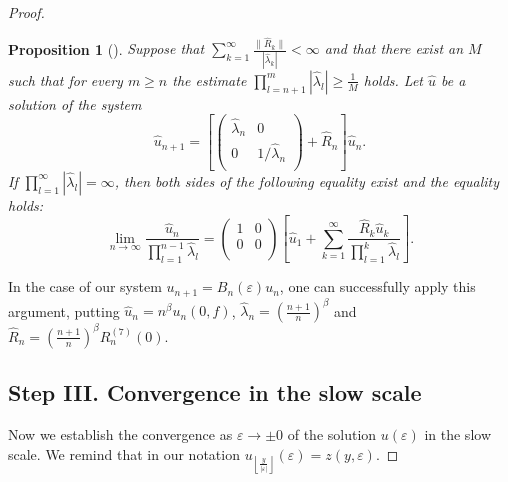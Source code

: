 \documentclass[a4paper,oneside,12pt]{amsart}
\newtheorem{prop}{Proposition}
\begin{document}
\begin{proof}
    \begin{prop}[\cite{Janas-Simonov-2010}]\label{proposition from Janas-Simonov}
    Suppose that $\sum\limits_{k=1}^{\infty}\frac{\|\hat R_k\|}{\left|\hat\lambda_k\right|}<\infty$ and that there exist an $M$ such that for every $m\ge n$ the estimate $\prod\limits_{l=n+1}^m|\hat\lambda_l|\ge\frac1M$ holds. Let $\hat u$ be a solution of the system
    \begin{equation*}
        \hat u_{n+1}=\left[
        \left(            \begin{array}{cc}
            \hat\lambda_n & 0 \\
            0 & 1/{\hat\lambda_n} \\
            \end{array}        \right)
        +\hat R_n\right]\hat u_n.
    \end{equation*}
    If $\prod\limits_{l=1}^{\infty}|\hat\lambda_l|=\infty$, then both sides of the following equality exist and the equality holds:
    \begin{equation*}
        \lim\limits_{n\rightarrow\infty}
        \frac{\hat u_n}{\prod\limits_{l=1}^{n-1}\hat\lambda_l}
        =
        \left(            \begin{array}{cc}
            1 & 0 \\
            0 & 0 \\
            \end{array}        \right)
        \left[
        \hat u_1+\sum\limits_{k=1}^{\infty}
        \frac{\hat R_k\hat u_k}{\prod\limits_{l=1}^k\hat\lambda_l}\right].
    \end{equation*}
    \end{prop}

In the case of our system $u_{n+1}=B_n(\varepsilon)u_n$, one can successfully apply this argument, putting $\hat u_n=n^{\beta}u_n(0,f)$, $\hat\lambda_n=\left(\frac{n+1}n\right)^{\beta}$ and $\hat R_n=\left(\frac{n+1}n\right)^{\beta}R^{(7)}_n(0)$.

\subsection*{Step III. Convergence in the slow scale}
Now we establish the convergence as $\varepsilon\rightarrow\pm0$ of the solution $u(\varepsilon)$ in the slow scale. We remind that in our notation $u_{\left\lfloor\frac y{|\varepsilon|}\right\rfloor}(\varepsilon)=z(y,\varepsilon)$.


\end{proof}
\end{document}
